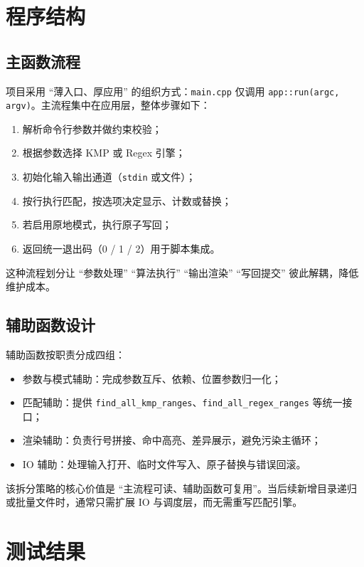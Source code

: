 \documentclass[12pt, a4paper]{ctexart}
\begin{document}
\section{程序结构}

\subsection{主函数流程}

项目采用 ``薄入口、厚应用'' 的组织方式：\texttt{main.cpp} 仅调用 \texttt{app::run(argc, argv)}。主流程集中在应用层，整体步骤如下：

\begin{enumerate}
    \item 解析命令行参数并做约束校验；
    \item 根据参数选择 KMP 或 Regex 引擎；
    \item 初始化输入输出通道（\texttt{stdin} 或文件）；
    \item 按行执行匹配，按选项决定显示、计数或替换；
    \item 若启用原地模式，执行原子写回；
    \item 返回统一退出码（0 / 1 / 2）用于脚本集成。
\end{enumerate}

这种流程划分让 ``参数处理'' ``算法执行'' ``输出渲染'' ``写回提交'' 彼此解耦，降低维护成本。

\subsection{辅助函数设计}

辅助函数按职责分成四组：

\begin{itemize}
    \item 参数与模式辅助：完成参数互斥、依赖、位置参数归一化；
    \item 匹配辅助：提供 \texttt{find_all_kmp_ranges}、\texttt{find_all_regex_ranges} 等统一接口；
    \item 渲染辅助：负责行号拼接、命中高亮、差异展示，避免污染主循环；
    \item IO 辅助：处理输入打开、临时文件写入、原子替换与错误回滚。
\end{itemize}

该拆分策略的核心价值是 ``主流程可读、辅助函数可复用''。当后续新增目录递归或批量文件时，通常只需扩展 IO 与调度层，而无需重写匹配引擎。

\section{测试结果}
\end{document}
